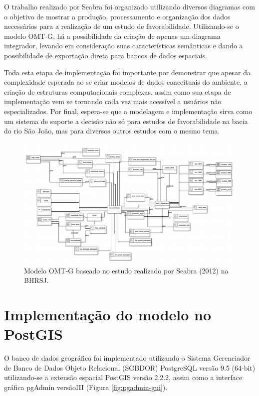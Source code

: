 O trabalho realizado por Seabra foi organizado utilizando diversos diagramas com o objetivo de mostrar a produção, processamento e organização dos dados necessários para a realização de um estudo de favorabilidade. Utilizando-se o modelo OMT-G, há a possibilidade da criação de apenas um diagrama integrador, levando em consideração suas características semânticas e dando a possibilidade de exportação direta para bancos de dados espaciais.

Toda esta etapa de implementação foi importante por demonstrar que apesar da complexidade esperada ao se criar modelos de dados conceituais do ambiente, a criação de estruturas computacionais complexas, assim como sua etapa de implementação vem se tornando cada vez mais acessível a usuários não especializados.  Por final, espera-se que a modelagem e implementação sirva como um sistema de suporte a decisão não só para estudos de favorabilidade na bacia do rio São João, mas para diversos outros estudos com o mesmo tema.

	\afterpage{\clearpage}
	\begin{figure}
		\centering
		\includegraphics[width=1\linewidth]{data/modelo_OMT-G_final}
		\caption{Modelo OMT-G baseado no estudo realizado por Seabra (2012)\cite{SEABRA} na BHRSJ.}
		\label{fig:modeloomt-gfinal}
	\end{figure}

\newpage
\section{Implementação do modelo no PostGIS}

O banco de dados geográfico foi implementado utilizando o Sistema Gerenciador de Banco de Dados Objeto Relacional (SGBDOR) PostgreSQL versão 9.5 (64-bit) utilizando-se a extensão espacial PostGIS versão 2.2.2, assim como a interface gráfica pgAdmin versãoIII (Figura \ref{fig:pgadmin-gui}). 

